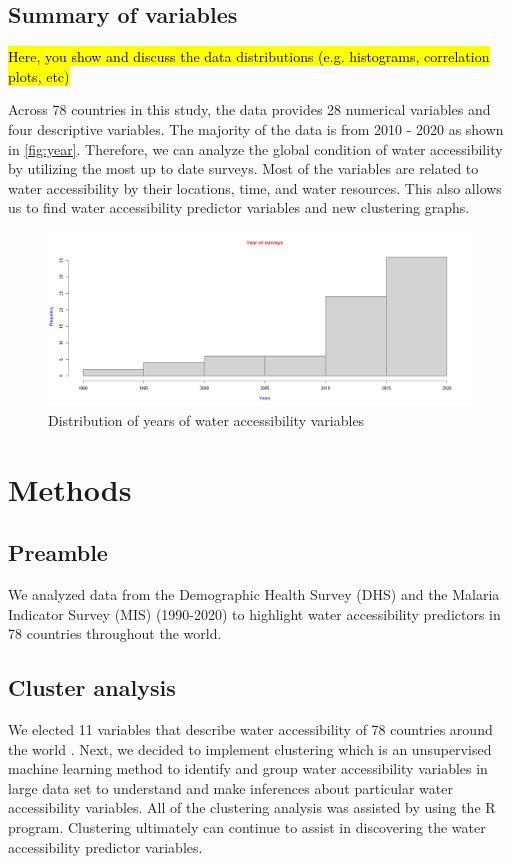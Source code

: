 \documentclass[10pt,twoside]{article}
\numberwithin{equation}{section}
\newcommand{\?}{\stackrel{?}{=}}
\begin{document}
 \subsection*{Summary of variables}
\hl{Here, you show and discuss the data distributions (e.g. histograms, correlation plots, etc)}

Across 78 countries in this study, the data provides 28 numerical variables and four descriptive variables. The majority of the data is from 2010 - 2020 as shown in \autoref{fig:year}. Therefore, we can analyze the global condition of water accessibility by utilizing the most up to date surveys. Most of the variables are related to water accessibility by their locations, time, and water resources. This also allows us to find water accessibility predictor variables and new clustering graphs. 

\begin{figure}[h!]
  \centering
  \includegraphics[width=.7\textwidth]{year}
  \caption{Distribution of years of water accessibility variables}
  \label{fig:year}
\end{figure}


\section*{Methods}

\subsection*{Preamble}
We analyzed data from the Demographic Health Survey (DHS) and the Malaria Indicator Survey (MIS) (1990-2020) to highlight water accessibility predictors in 78 countries throughout the world.

\subsection*{Cluster analysis}
We elected 11 variables that describe water accessibility of 78 countries around the world \citep{price2019difference}. Next, we decided to implement clustering which is an unsupervised machine learning method to identify and group water accessibility variables in large data set to understand and make inferences about particular water accessibility variables. All of the clustering analysis was assisted by using the R program. Clustering ultimately can continue to assist in discovering the water accessibility predictor variables. 
\end{document}
